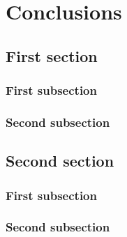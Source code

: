 \chapter{Conclusions}\label{chapter:conclusion}
\thispagestyle{chapterBeginStyle}

\section{First section}
\subsection{First subsection}
\subsection{Second subsection}

\section{Second section}
\subsection{First subsection}
\subsection{Second subsection}